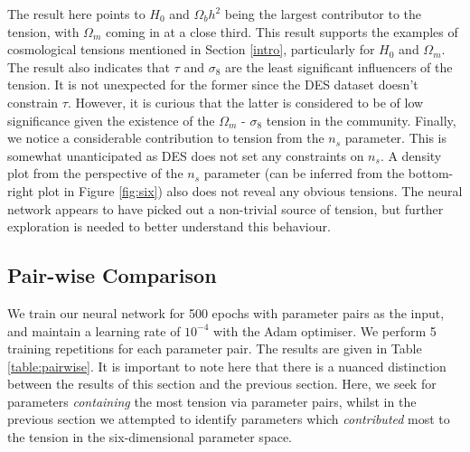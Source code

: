 \documentclass[%
 reprint,
 amsmath,amssymb,
 aps,
]{revtex4-2}
\begin{document}
The result here points to $H_0$ and $\Omega_b h^2$ being the largest contributor to the tension, with $\Omega_m$ coming in at a close third. This result supports the examples of cosmological tensions mentioned in Section \ref{intro}, particularly for $H_0$ and $\Omega_m$. The result also indicates that $\tau$ and $\sigma_8$ are the least significant influencers of the tension. It is not unexpected for the former since the DES dataset doesn't constrain $\tau$. However, it is curious that the latter is considered to be of low significance given the existence of the $\Omega_m$ - $\sigma_8$ tension in the community. Finally, we notice a considerable contribution to tension from the $n_s$ parameter. This is somewhat unanticipated as DES does not set any constraints on $n_s$. A density plot from the perspective of the $n_s$ parameter (can be inferred from the bottom-right plot in Figure \ref{fig:six}) also does not reveal any obvious tensions. The neural network appears to have picked out a non-trivial source of tension, but further exploration is needed to better understand this behaviour.


\subsection{Pair-wise Comparison} \label{section:pair}

We train our neural network for 500 epochs with parameter pairs as the input, and maintain a learning rate of $10^{-4}$ with the Adam optimiser. We perform 5 training repetitions for each parameter pair. The results are given in Table \ref{table:pairwise}. It is important to note here that there is a nuanced distinction between the results of this section and the previous section. Here, we seek for parameters \textit{containing} the most tension via parameter pairs, whilst in the previous section we attempted to identify parameters which \textit{contributed} most to the tension in the six-dimensional parameter space.
\end{document}
